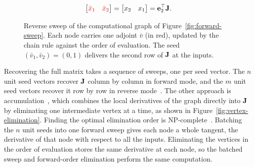 \begin{figure}[tb]
\centering
{}
\[
\begin{bmatrix} \textcolor{adjCol}{\bar x_1} & \textcolor{adjCol}{\bar x_2} \end{bmatrix}
= \begin{bmatrix} x_2 & x_1 \end{bmatrix}
= \mvec{e}_2^\top \mmat{J}.
\]
\caption[Reverse sweep of a computational graph]{Reverse sweep of the computational graph of
Figure~\ref{fig:forward-sweep}. Each node carries one adjoint $\bar v$ (in red), updated by
the chain rule against the order of evaluation. The seed $(\bar v_1, \bar v_2) = (0, 1)$
delivers the second row of $\mathbf{J}$ at the inputs.}
\label{fig:reverse-sweep}
\end{figure}

Recovering the full matrix takes a sequence of sweeps, one per seed vector. The $n$ unit seed
vectors recover $\mathbf{J}$ column by column in forward mode,
and the $m$ unit seed vectors recover it row by
row in reverse mode~\cite{griewank2008evaluating}. The other approach is
accumulation~\cite{griewank1991markowitz}, which combines the local derivatives of the graph
directly into $\mathbf{J}$ by eliminating one intermediate vertex at a time, as shown in
Figure~\ref{fig:vertex-elimination}. Finding the optimal elimination
order is NP-complete~\cite{naumann2008optimal, griewank2008evaluating}. Batching the $n$
unit seeds into one forward sweep gives each node a whole tangent, the derivative of that
node with respect to all the inputs. Eliminating the vertices in the order of evaluation
stores the same derivative at each node, so the batched sweep and forward-order elimination
perform the same computation.

